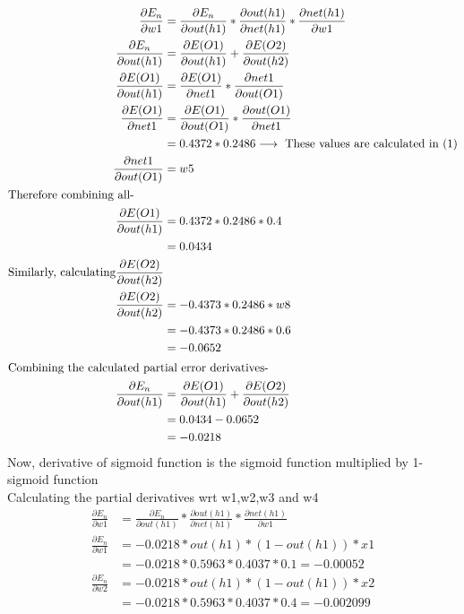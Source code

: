 \documentclass[12pt]{article}
\begin{document}
\begin{align*}
    \frac{\partial E_n}{\partial w1}
    &=\frac{\partial E_n}{\partial out(h1)}*\frac{\partial out(h1)}{\partial net(h1)} * \frac{\partial net(h1)}{\partial w1}\\
    \frac{\partial E_n}{\partial out(h1)}
    &=\frac{\partial E(O1)}{\partial out(h1)} + \frac{\partial E(O2)}{\partial out(h2)}\\
    \frac{\partial E(O1)}{\partial out(h1)}
    &=\frac{\partial E(O1)}{\partial net1}*\frac{\partial net1}{\partial out(O1)}\\
    \frac{\partial E(O1)}{\partial net1}
    &=\frac{\partial E(O1)}{\partial out(O1)}*\frac{\partial out(O1)}{\partial net1}\\
    &=0.4372*0.2486 \longrightarrow \text{ These values are calculated in (1)}\\
    \frac{\partial net1}{\partial out(O1)}
    &= w5 \\
    \intertext{Therefore combining all-}
    \frac{\partial E(O1)}{\partial out(h1)}
    &=0.4372*0.2486*0.4 \\
    &=0.0434 \\
    \text{Similarly, calculating} \frac{\partial E(O2)}{\partial out(h2)}\\
    \frac{\partial E(O2)}{\partial out(h2)}
    &=-0.4373*0.2486*w8\\
    &=-0.4373*0.2486*0.6\\
    &=-0.0652\\
    \intertext{Combining the calculated partial error derivatives-}
    \frac{\partial E_n}{\partial out(h1)}
    &=\frac{\partial E(O1)}{\partial out(h1)} + \frac{\partial E(O2)}{\partial out(h2)}\\
    &=0.0434-0.0652\\
    &=-0.0218
\end{align*}
Now, derivative of sigmoid function is the sigmoid function multiplied by 1-sigmoid function\\
Calculating the partial derivatives wrt w1,w2,w3 and w4
\begin{align*}
    \frac{\partial E_n}{\partial w1}
    &=\frac{\partial E_n}{\partial out(h1)} * \frac{\partial out(h1)}{\partial net(h1)} * \frac{\partial net(h1)}{\partial w1} \\
    \frac{\partial E_n}{\partial w1}
    &=-0.0218*out(h1)*(1-out(h1)) * x1\\
    &=-0.0218*0.5963*0.4037*0.1=-0.00052
\end{align*}
\begin{align*}
    \frac{\partial E_n}{\partial w2}
    &=-0.0218*out(h1)*(1-out(h1)) * x2\\
    &=-0.0218*0.5963*0.4037*0.4=-0.002099
\end{align*}
\end{document}
